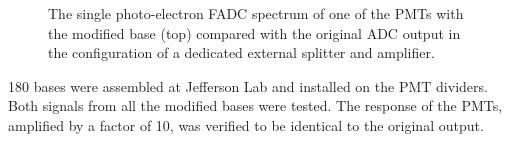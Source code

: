 \begin{figure}
	\caption{The single photo-electron FADC spectrum of one of the PMTs with the modified base (top) compared with the original ADC output in the
            configuration of a dedicated external splitter and amplifier. }
	\label{fig:dividerTests}
\end{figure}

180 bases were assembled at Jefferson Lab and installed on the PMT dividers. Both signals from all the modified bases were tested.
The response of the PMTs, amplified by a factor of 10, was verified to be identical to the original output.


